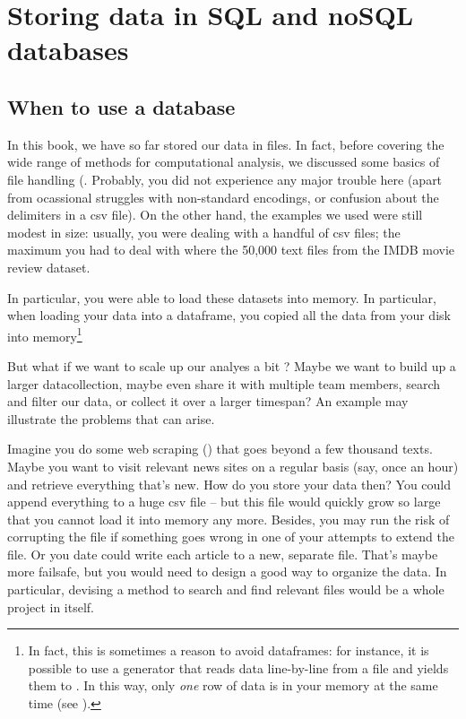 \section{Storing data in SQL and noSQL databases}
\label{sec:databases}

\subsection{When to use a database}
In this book, we have so far stored our data in files. In fact, before
covering the wide range of methods for computational analysis, we
discussed some basics of file handling
(. Probably, you did not experience any major
trouble here (apart from ocassional struggles with non-standard
encodings, or confusion about the delimiters in a csv file). On the
other hand, the examples we used were still modest in size: usually,
you were dealing with a handful of csv files; the maximum you had to
deal with where the 50,000 text files from the IMDB movie review
dataset.

In particular, you were able to load these datasets into memory. In
particular, when loading your data into a dataframe, you copied all
the data from your disk into memory\footnote{In fact, this is
  sometimes a reason to avoid dataframes: for instance, it is possible
  to use a generator that reads data line-by-line from a file and
  yields them to . In this way, only \emph{one} row
  of data is in your memory at the same time (see ).}

But what if we want to scale up our analyes a bit
\cite[see][]{Trilling2018b}? Maybe we want to build up a larger
datacollection, maybe even share it with multiple team members, search
and filter our data, or collect it over a larger timespan? An
example may illustrate the problems that can arise.

Imagine you do some web scraping () that goes beyond
a few thousand texts. Maybe you want to visit relevant news sites on a
regular basis (say, once an hour) and retrieve everything that's
new. How do you store your data then? You could append everything to a
huge csv file -- but this file would quickly grow so large that you
cannot load it into memory any more. Besides, you may run the risk of
corrupting the file if something goes wrong in one of your attempts to
extend the file. Or you date could write each article to a new, separate file.
That's maybe more failsafe, but you would need to design a good way
to organize the data. In particular, devising a method to search
and find relevant files would be a whole project in itself.


